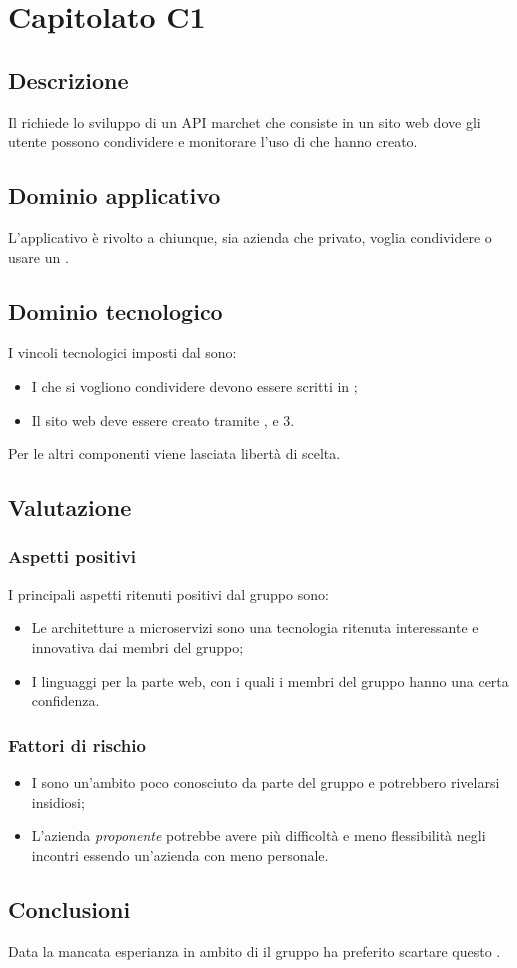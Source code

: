 \documentclass[../StudioDiFattibilita.tex]{subfiles}
\begin{document}
	\section{Capitolato C1}
		\subsection{Descrizione}
		Il  richiede lo sviluppo di un API marchet che consiste in un sito web dove gli utente possono condividere e monitorare l'uso di  che hanno creato.
		\subsection{Dominio applicativo}
		L'applicativo è rivolto a chiunque, sia azienda che privato, voglia condividere o usare un .
		\subsection{Dominio tecnologico} 
		I vincoli tecnologici imposti dal  sono:
		\begin{itemize}
			\item I  che si vogliono condividere devono essere scritti in ;
			\item	Il sito web deve essere creato tramite ,  e 3.
		\end{itemize}
		Per le altri componenti viene lasciata libertà di scelta.
		\subsection{Valutazione}
			\subsubsection{Aspetti positivi}
			I principali aspetti ritenuti positivi dal gruppo sono:
				\begin{itemize}
				\item Le architetture a microservizi sono una tecnologia ritenuta interessante e innovativa dai membri del gruppo; 
				\item I linguaggi per la parte web, con i quali i membri del gruppo hanno una certa confidenza.
			\end{itemize}
			\subsubsection{Fattori di rischio}
				\begin{itemize}
				\item I  sono un'ambito poco conosciuto da parte del gruppo e potrebbero rivelarsi insidiosi;
				\item L'azienda \textit{proponente} potrebbe avere più difficoltà e meno flessibilità negli incontri essendo un'azienda con meno personale.
			\end{itemize}
			\subsection{Conclusioni}
			Data la mancata esperianza in ambito di  il gruppo ha preferito scartare questo .
\end{document}
